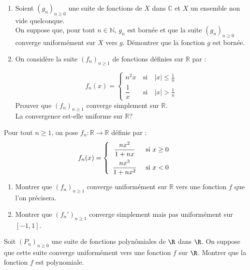 \documentclass[a4paper,10pt]{report}
\begin{document}
\begin{Exa} 
\begin{enumerate}

\item Soient $(g_n)_{n \geq 0}$ une suite de fonctions de $X$ dans $\mathbb{C}$ et $X$ un ensemble non vide quelconque.\\
On suppose que, pour tout $n\in \mathbb{N}$, $g_n$ est bornée et que la suite $(g_n)_{n \geq 0}$ converge uniformément sur $X$ vers $g$. Démontrer que la fonction  $g$ est bornée.
\item
On considère la suite  $(f_n)_{n \geq 1}$ de fonctions  définies sur $\mathbb{R}$ par : 

$$f_n(x)=\left\lbrace \begin{array}{lll}
n^2x&\:\text{si}\:&|x|\leq \frac{1}{n}\\[0.3cm]
\dfrac{1}{x}&\:\text{si}\:&|x|>\frac{1}{n}
\end{array}\right.$$
Prouver que $(f_n)_{n \geq 1}$  converge simplement sur $\mathbb{R}$.\\
La convergence est-elle uniforme sur $\mathbb{R}$?

\end{enumerate}
\end{Exa}


\begin{Exa} Pour tout $n \geq 1$, on pose $f_n : \mathbb{R} \rightarrow \mathbb{R}$ définie par :
$$ f_n(x)= \left\lbrace \begin{array}{cl}
\dfrac{nx^2}{1+nx} & \hbox{ si } x \geq 0 \\[0.3cm]
\dfrac{nx^3}{1+nx^2} & \hbox{ si } x < 0 \\
\end{array}\right.$$
\begin{enumerate}
\item Montrer que $(f_n)_{n \geq 1}$ converge uniformément sur $\mathbb{R}$ vers une fonction $f$ que l'on précisera.
\item Montrer que $(f_n')_{n \geq 1}$ converge simplement mais pas uniformément sur $[-1,1]$.
\end{enumerate}
\end{Exa}




\begin{Exa}[\ding{80}] Soit $(P_{n})_{n \geq 0}$ une suite de fonctions polynômiales de $\R$ dans $\R$. On suppose que cette suite converge uniformément vers une fonction $f$ sur $\R$. Montrer que la fonction $f$ est polynomiale.
\end{Exa}
\end{document}
